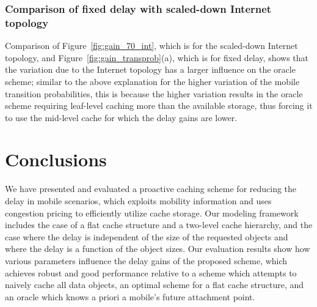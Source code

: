 \documentclass[conference]{IEEEtran}
\newcommand{\mynote}[1]{{{\medskip
\footnotesize \em \noindent Note: #1}}\medskip}
\renewcommand{\mynote}[1]{}
\begin{document}
\subsubsection{Comparison of fixed  delay with scaled-down  Internet topology} Comparison of Figure~\ref{fig:gain_70_int}, which is for the scaled-down Internet topology, and  Figure~\ref{fig:gain_transprob}(a), which is for fixed delay, shows that the variation due to the Internet topology has a larger influence on the oracle scheme; similar to the above explanation for the higher variation of the mobile transition probabilities, this is because the higher variation results in the oracle scheme  requiring leaf-level caching more than the available storage, thus forcing it to use the mid-level cache for which the delay gains are lower.



\mynote{
\begin{itemize}
\item need to check/verify this explanation.
\end{itemize}
}




\vspace{-0.09in}
\section{Conclusions}
\label{sec:conclusions}
\vspace{-0.03in}

We have presented and evaluated a proactive caching scheme for reducing the delay in mobile scenarios, which exploits mobility information and uses congestion pricing  to efficiently utilize cache storage. Our modeling framework includes the case of a  flat cache structure and a two-level cache hierarchy, and  the case where the delay is independent of the size of the requested objects and  where the delay is a function of the object sizes. Our evaluation results
show how various parameters influence the delay gains of the proposed  scheme, which achieves robust and good performance relative to a scheme which attempts to naively cache all data objects,  an optimal scheme for a flat cache structure, and an oracle which knows a priori a mobile's future  attachment point.
\end{document}
